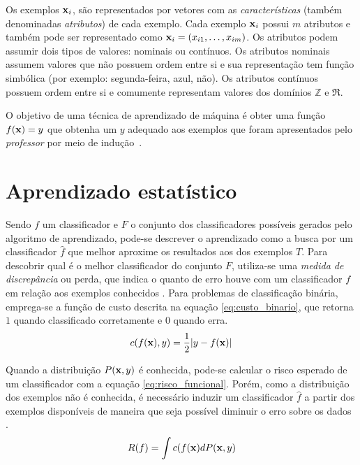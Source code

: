 Os exemplos $\mathbf{x}_i$, são representados por vetores com as \emph{características} (também denominadas \emph{atributos}) de cada exemplo. Cada exemplo $\mathbf{x}_i$ possui $m$ atributos e também pode ser representado como $\mathbf{x}_i = (x_{i1},\dotsc,x_{im})$. Os atributos podem assumir dois tipos de valores: nominais ou contínuos. Os atributos nominais assumem valores que não possuem ordem entre si e sua representação tem função simbólica (por exemplo: segunda-feira, azul, não). Os atributos contínuos possuem ordem entre si e comumente representam valores dos domínios $\mathbb{Z}$ e $\Re$.

O objetivo de uma técnica de aprendizado de máquina é obter uma função $f(\mathbf{x}) = y$ que obtenha um $y$ adequado aos exemplos que foram apresentados pelo \emph{professor} por meio de indução~\cite{osuna1997support}.


\section{Aprendizado estatístico}\label{sec:aprendizado}

Sendo $f$ um classificador e $F$ o conjunto dos classificadores possíveis gerados pelo algoritmo de aprendizado, pode-se descrever o aprendizado como a busca por um classificador $\hat{f}$ que melhor aproxime os resultados aos dos exemplos $T$. Para descobrir qual é o melhor classificador do conjunto $F$, utiliza-se uma \emph{medida de discrepância} ou perda, que indica o quanto de erro houve com um classificador $f$ em relação aos exemplos conhecidos \cite{vapnik1998statistical}. Para problemas de classificação binária, emprega-se a função de custo descrita na equação \ref{eq:custo_binario}, que retorna $1$ quando classificado corretamente e $0$ quando erra.
\begin{equation}\label{eq:custo_binario}
  c(f(\mathbf{x}), y) = \frac{1}{2} | y - f(\mathbf{x})|
\end{equation}

Quando a distribuição $P(\mathbf{x},y)$ é conhecida, pode-se calcular o risco esperado de um classificador com a equação \ref{eq:risco_funcional}. Porém, como a distribuição dos exemplos não é conhecida, é necessário induzir um classificador $\hat{f}$ a partir dos exemplos disponíveis de maneira que seja possível diminuir o erro sobre os dados \cite{scholkopf2002learning}. 
\begin{equation}\label{eq:risco_funcional}
  R(f) = \int{ c(f(\mathbf{x})dP(\mathbf{x}, y) }
\end{equation}

